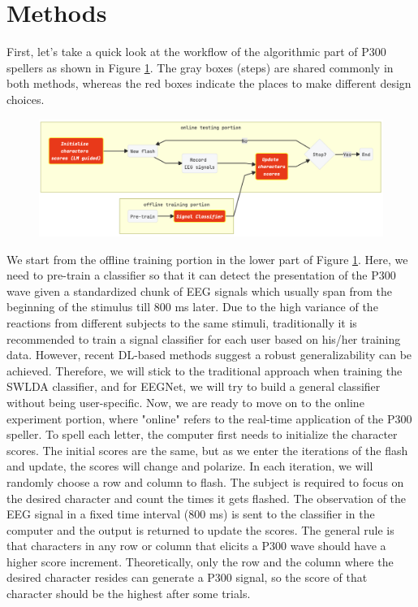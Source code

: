 \documentclass{article}
\begin{document}
\section{Methods} \label{Methods}
First, let's take a quick look at the workflow of the algorithmic part of P300 spellers as shown in Figure \ref{fig:3}. The gray boxes (steps) are shared commonly in both methods, whereas the red boxes indicate the places to make different design choices. 

\vspace{-3mm}
\begin{figure}[H]
	\centering
	\includegraphics[width=1.0\linewidth]{framework.jpg}
	\label{fig:3}
\end{figure}

\vspace{-3mm}
We start from the offline training portion in the lower part of Figure \ref{fig:3}. Here, we need to pre-train a classifier so that it can detect the presentation of the P300 wave given a standardized chunk of EEG signals which usually span from the beginning of the stimulus till $800$ ms later. Due to the high variance of the reactions from different subjects to the same stimuli, traditionally it is recommended to train a signal classifier for each user based on his/her training data. However, recent DL-based methods suggest a robust generalizability can be achieved. Therefore, we will stick to the traditional approach when training the SWLDA classifier, and for EEGNet, we will try to build a general classifier without being user-specific. Now, we are ready to move on to the online experiment portion, where "online" refers to the real-time application of the P300 speller. To spell each letter, the computer first needs to initialize the character scores. The initial scores are the same, but as we enter the iterations of the flash and update, the scores will change and polarize. In each iteration, we will randomly choose a row and column to flash. The subject is required to focus on the desired character and count the times it gets flashed. The observation of the EEG signal in a fixed time interval (800 ms) is sent to the classifier in the computer and the output is returned to update the scores. The general rule is that characters in any row or column that elicits a P300 wave should have a higher score increment. Theoretically, only the row and the column where the desired character resides can generate a P300 signal, so the score of that character should be the highest after some trials.\\
\end{document}
